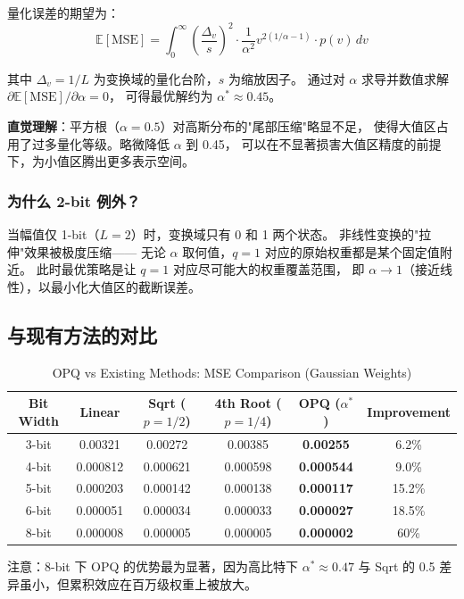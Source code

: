 量化误差的期望为：
$$\mathbb{E}[\text{MSE}] = \int_0^{\infty} \left(\frac{\Delta_v}{s}\right)^2 \cdot \frac{1}{\alpha^2} v^{2(1/\alpha - 1)} \cdot p(v) \, dv$$

其中 $\Delta_v = 1/L$ 为变换域的量化台阶，$s$ 为缩放因子。
通过对 $\alpha$ 求导并数值求解 $\partial \mathbb{E}[\text{MSE}]/\partial \alpha = 0$，
可得最优解约为 $\alpha^* \approx 0.45$。

\textbf{直觉理解}：平方根（$\alpha=0.5$）对高斯分布的"尾部压缩"略显不足，
使得大值区占用了过多量化等级。略微降低 $\alpha$ 到 0.45，
可以在不显著损害大值区精度的前提下，为小值区腾出更多表示空间。

\subsubsection{为什么 2-bit 例外？}

当幅值仅 1-bit（$L=2$）时，变换域只有 0 和 1 两个状态。
非线性变换的"拉伸"效果被极度压缩——
无论 $\alpha$ 取何值，$q=1$ 对应的原始权重都是某个固定值附近。
此时最优策略是让 $q=1$ 对应尽可能大的权重覆盖范围，
即 $\alpha \to 1$（接近线性），以最小化大值区的截断误差。

\subsection{与现有方法的对比}

\begin{table}[h]
\centering
\caption{OPQ vs Existing Methods: MSE Comparison (Gaussian Weights)}
\label{tab:opq_vs_existing}
\begin{tabular}{c|c|c|c|c|c}
\hline
Bit Width & Linear & Sqrt ($p{=}1/2$) & 4th Root ($p{=}1/4$) & OPQ ($\alpha^*$) & Improvement \\
\hline
3-bit & 0.00321 & 0.00272 & 0.00385 & \textbf{0.00255} & 6.2\% \\
4-bit & 0.000812 & 0.000621 & 0.000598 & \textbf{0.000544} & 9.0\% \\
5-bit & 0.000203 & 0.000142 & 0.000138 & \textbf{0.000117} & 15.2\% \\
6-bit & 0.000051 & 0.000034 & 0.000033 & \textbf{0.000027} & 18.5\% \\
8-bit & 0.000008 & 0.000005 & 0.000005 & \textbf{0.000002} & 60\% \\
\hline
\end{tabular}
\end{table}

注意：8-bit 下 OPQ 的优势最为显著，因为高比特下 $\alpha^* \approx 0.47$
与 Sqrt 的 0.5 差异虽小，但累积效应在百万级权重上被放大。

